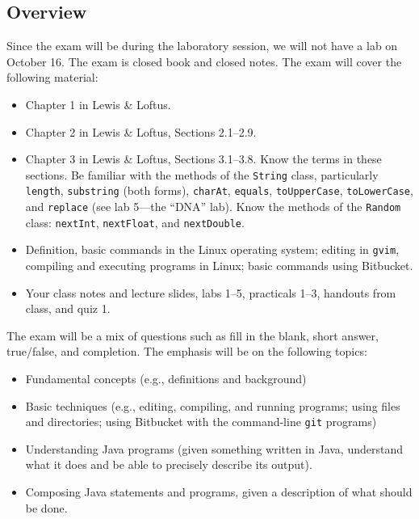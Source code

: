 


\subsection*{Overview}

Since the exam will be during the laboratory session, we will not have a
lab on October 16. The exam is closed book and closed notes. The exam will
cover the following material:

\begin{itemize}
\item
Chapter 1 in Lewis \& Loftus.
\item
Chapter 2 in Lewis \& Loftus, Sections 2.1--2.9.
\item
Chapter 3 in Lewis \& Loftus, Sections 3.1--3.8.
Know the terms in these sections. Be familiar with the methods of the {\tt String}
class, particularly {\tt length}, {\tt substring} (both forms),
{\tt charAt}, {\tt equals}, {\tt toUpperCase}, {\tt toLowerCase}, and {\tt replace}
(see lab 5---the ``DNA'' lab).
Know the methods of the {\tt Random} class: {\tt nextInt}, {\tt nextFloat}, and {\tt nextDouble}.
\item
Definition, basic commands in the Linux
operating system; editing in {\tt gvim}, compiling and executing programs
in Linux; basic commands using Bitbucket.
\item
Your class notes and lecture slides, labs 1--5, practicals 1--3, handouts from class, and quiz 1.
\end{itemize}

\noindent The exam will be a mix of questions such as fill in the blank, short answer, true/false, and completion.  The
emphasis will be on the following topics:

\begin{itemize}
\item
Fundamental concepts (e.g., definitions and background)
\item
Basic techniques (e.g., editing, compiling, and running programs; using
  files and directories; using Bitbucket with the command-line {\tt git} programs)
\item
Understanding Java programs (given something written in Java, understand
what it does and be able to precisely describe its output).
\item
Composing Java statements and programs, given a description of what
should be done.
\end{itemize}

